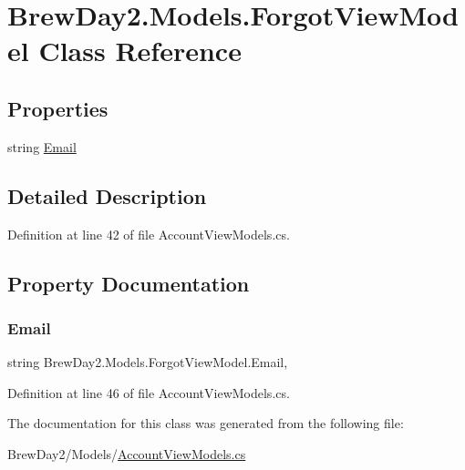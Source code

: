\hypertarget{class_brew_day2_1_1_models_1_1_forgot_view_model}{}\section{Brew\+Day2.\+Models.\+Forgot\+View\+Model Class Reference}
\label{class_brew_day2_1_1_models_1_1_forgot_view_model}
\subsection*{Properties}
\begin{DoxyCompactItemize}
\item 
string \mbox{\hyperlink{class_brew_day2_1_1_models_1_1_forgot_view_model_a03edcc1a8bb439fcdf2078e4df1ac2a4}{Email}}
\end{DoxyCompactItemize}


\subsection{Detailed Description}


Definition at line 42 of file Account\+View\+Models.\+cs.



\subsection{Property Documentation}
\mbox{\label{class_brew_day2_1_1_models_1_1_forgot_view_model_a03edcc1a8bb439fcdf2078e4df1ac2a4}} 
\subsubsection{\texorpdfstring{Email}{Email}}
{\footnotesize\ttfamily string Brew\+Day2.\+Models.\+Forgot\+View\+Model.\+Email\hspace{0.3cm}{\ttfamily [get]}, {\ttfamily [set]}}



Definition at line 46 of file Account\+View\+Models.\+cs.



The documentation for this class was generated from the following file\+:\begin{DoxyCompactItemize}
\item 
Brew\+Day2/\+Models/\mbox{\hyperlink{_account_view_models_8cs}{Account\+View\+Models.\+cs}}\end{DoxyCompactItemize}
